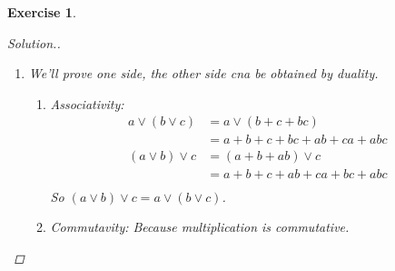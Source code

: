 \documentclass{article}
\theoremstyle{breakstyle}
\newtheorem{exercise}{Exercise}
\newenvironment{solution}
  {\begin{proof}[Solution.]\renewcommand{\qedsymbol}{}}
  {\end{proof}}
\begin{document}
\begin{exercise}
\begin{solution}
\begin{enumerate}[label=({\alph*})]
\begin{enumerate}[label=({\Roman*})]
\begin{enumerate}[label=({\roman*})]
$$                                ab=a\wedge b=b\wedge a=ba
                                $$
                            \item 
                                $$
                                a\cdot 1=a\wedge 1=a
                                $$
                            \item Associative of multiplication is given by the associativity of $\vee $.
                            \item 
                                \begin{align*}
                                    a(b+c)&= a(bc'\vee b'c) \\
                                    &= abc'\vee ab'c
                                \end{align*}
                                \begin{align*}
                                    ab+ac&= ((a'\vee b')ac)\vee (ab(a'\vee c')) \\
                                    &= ab'c\vee abc'
                                \end{align*}
                                And we obtian the distributive law.
                        \end{enumerate}
                    \item For Boolean property:
                        $a^2=a\wedge a=a$.
                \end{enumerate}
            \item We'll prove one side, the other side cna be obtained by duality.
                \begin{enumerate}[label=({\roman*})]
                    \item Associativity:
                        \begin{align*}
                            a\vee (b\vee c)&= a\vee (b+c+bc) \\
                            &= a+b+c+bc+ab+ca+abc
                        \end{align*}
                        \begin{align*}
                            (a\vee b)\vee c&= (a+b+ab)\vee c \\
                            &= a+b+c+ab+ca+bc+abc \\
                        \end{align*}
                        So $(a\vee b)\vee c=a\vee (b\vee c)$.
                    \item Commutavity: Because multiplication is commutative.

\end{enumerate}
\end{enumerate}
\end{solution}
\end{exercise}
\end{document}
